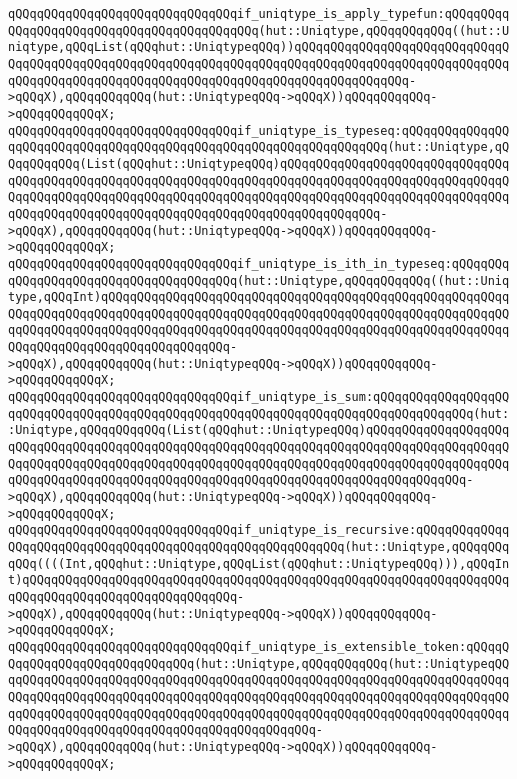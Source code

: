 \verb|qQQqqQQqqQQqqQQqqQQqqQQqqQQqqQQqif_uniqtype_is_apply_typefun:qQQqqQQqqQQqqQQqqQQqqQQqqQQqqQQqqQQqqQQqqQQq(hut::Uniqtype,qQQqqQQqqQQq((hut::Uniqtype,qQQqList(qQQqhut::UniqtypeqQQq))qQQqqQQqqQQqqQQqqQQqqQQqqQQqqQQqqQQqqQQqqQQqqQQqqQQqqQQqqQQqqQQqqQQqqQQqqQQqqQQqqQQqqQQqqQQqqQQqqQQqqQQqqQQqqQQqqQQqqQQqqQQqqQQqqQQqqQQqqQQqqQQqqQQqqQQqqQQq->qQQqX),qQQqqQQqqQQq(hut::UniqtypeqQQq->qQQqX))qQQqqQQqqQQq->qQQqqQQqqQQqX;|\newline
\verb|qQQqqQQqqQQqqQQqqQQqqQQqqQQqqQQqif_uniqtype_is_typeseq:qQQqqQQqqQQqqQQqqQQqqQQqqQQqqQQqqQQqqQQqqQQqqQQqqQQqqQQqqQQqqQQqqQQq(hut::Uniqtype,qQQqqQQqqQQq(List(qQQqhut::UniqtypeqQQq)qQQqqQQqqQQqqQQqqQQqqQQqqQQqqQQqqQQqqQQqqQQqqQQqqQQqqQQqqQQqqQQqqQQqqQQqqQQqqQQqqQQqqQQqqQQqqQQqqQQqqQQqqQQqqQQqqQQqqQQqqQQqqQQqqQQqqQQqqQQqqQQqqQQqqQQqqQQqqQQqqQQqqQQqqQQqqQQqqQQqqQQqqQQqqQQqqQQqqQQqqQQqqQQqqQQqqQQqqQQqqQQq->qQQqX),qQQqqQQqqQQq(hut::UniqtypeqQQq->qQQqX))qQQqqQQqqQQq->qQQqqQQqqQQqX;|\newline
\verb|qQQqqQQqqQQqqQQqqQQqqQQqqQQqqQQqif_uniqtype_is_ith_in_typeseq:qQQqqQQqqQQqqQQqqQQqqQQqqQQqqQQqqQQqqQQq(hut::Uniqtype,qQQqqQQqqQQq((hut::Uniqtype,qQQqInt)qQQqqQQqqQQqqQQqqQQqqQQqqQQqqQQqqQQqqQQqqQQqqQQqqQQqqQQqqQQqqQQqqQQqqQQqqQQqqQQqqQQqqQQqqQQqqQQqqQQqqQQqqQQqqQQqqQQqqQQqqQQqqQQqqQQqqQQqqQQqqQQqqQQqqQQqqQQqqQQqqQQqqQQqqQQqqQQqqQQqqQQqqQQqqQQqqQQqqQQqqQQqqQQqqQQqqQQqqQQqqQQqqQQq->qQQqX),qQQqqQQqqQQq(hut::UniqtypeqQQq->qQQqX))qQQqqQQqqQQq->qQQqqQQqqQQqX;|\newline
\verb|qQQqqQQqqQQqqQQqqQQqqQQqqQQqqQQqif_uniqtype_is_sum:qQQqqQQqqQQqqQQqqQQqqQQqqQQqqQQqqQQqqQQqqQQqqQQqqQQqqQQqqQQqqQQqqQQqqQQqqQQqqQQqqQQq(hut::Uniqtype,qQQqqQQqqQQq(List(qQQqhut::UniqtypeqQQq)qQQqqQQqqQQqqQQqqQQqqQQqqQQqqQQqqQQqqQQqqQQqqQQqqQQqqQQqqQQqqQQqqQQqqQQqqQQqqQQqqQQqqQQqqQQqqQQqqQQqqQQqqQQqqQQqqQQqqQQqqQQqqQQqqQQqqQQqqQQqqQQqqQQqqQQqqQQqqQQqqQQqqQQqqQQqqQQqqQQqqQQqqQQqqQQqqQQqqQQqqQQqqQQqqQQqqQQqqQQqqQQq->qQQqX),qQQqqQQqqQQq(hut::UniqtypeqQQq->qQQqX))qQQqqQQqqQQq->qQQqqQQqqQQqX;|\newline
\verb|qQQqqQQqqQQqqQQqqQQqqQQqqQQqqQQqif_uniqtype_is_recursive:qQQqqQQqqQQqqQQqqQQqqQQqqQQqqQQqqQQqqQQqqQQqqQQqqQQqqQQqqQQq(hut::Uniqtype,qQQqqQQqqQQq((((Int,qQQqhut::Uniqtype,qQQqList(qQQqhut::UniqtypeqQQq))),qQQqInt)qQQqqQQqqQQqqQQqqQQqqQQqqQQqqQQqqQQqqQQqqQQqqQQqqQQqqQQqqQQqqQQqqQQqqQQqqQQqqQQqqQQqqQQqqQQqqQQqqQQq->qQQqX),qQQqqQQqqQQq(hut::UniqtypeqQQq->qQQqX))qQQqqQQqqQQq->qQQqqQQqqQQqX;|\newline
\verb|qQQqqQQqqQQqqQQqqQQqqQQqqQQqqQQqif_uniqtype_is_extensible_token:qQQqqQQqqQQqqQQqqQQqqQQqqQQqqQQq(hut::Uniqtype,qQQqqQQqqQQq(hut::UniqtypeqQQqqQQqqQQqqQQqqQQqqQQqqQQqqQQqqQQqqQQqqQQqqQQqqQQqqQQqqQQqqQQqqQQqqQQqqQQqqQQqqQQqqQQqqQQqqQQqqQQqqQQqqQQqqQQqqQQqqQQqqQQqqQQqqQQqqQQqqQQqqQQqqQQqqQQqqQQqqQQqqQQqqQQqqQQqqQQqqQQqqQQqqQQqqQQqqQQqqQQqqQQqqQQqqQQqqQQqqQQqqQQqqQQqqQQqqQQqqQQqqQQqqQQqqQQqqQQq->qQQqX),qQQqqQQqqQQq(hut::UniqtypeqQQq->qQQqX))qQQqqQQqqQQq->qQQqqQQqqQQqX;|\newline
